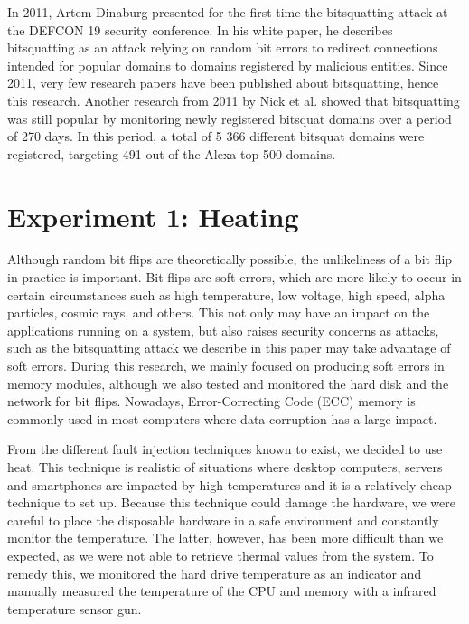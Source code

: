 \documentclass[conference]{IEEEtran}
\begin{document}
In 2011, Artem Dinaburg presented for the first time the bitsquatting attack at
the DEFCON 19 security conference. In his
white paper\cite{dinaburg2011bitsquatting}, he describes bitsquatting as an
attack relying on random bit errors to redirect connections intended for
popular domains to domains registered by malicious entities. Since 2011, very
few research papers have been published about bitsquatting, hence this
research. Another research from 2011 by Nick et
al.\cite{nikiforakis2013bitsquatting} showed that bitsquatting was still
popular by monitoring newly registered bitsquat domains over a period of
270 days. In this period, a total of 5 366 different bitsquat domains were
registered, targeting 491 out of the Alexa top 500 domains.

\section{Experiment 1: Heating}\label{sec:exp1}

Although random bit flips are theoretically possible, the unlikeliness of a bit
flip in practice is important. Bit flips are soft errors, which are more likely
to occur in certain circumstances such as high temperature, low voltage, high
speed, alpha particles, cosmic rays, and others. This not only may have an
impact on the applications running on a system, but also raises security
concerns as attacks, such as the bitsquatting attack we describe in this paper
may take advantage of soft errors. During this research, we mainly focused on
producing soft errors in memory modules, although we also tested and monitored
the hard disk and the network for bit flips. Nowadays, Error-Correcting Code
(ECC) memory is commonly used in most computers where data corruption has a
large impact.

From the different fault injection techniques known to
exist\cite{barenghi2012fault}, we decided to use heat. This technique is
realistic of situations where desktop computers, servers and smartphones are
impacted by high temperatures and it is a relatively cheap technique to set up.
Because this technique could damage the hardware, we were careful to place the
disposable hardware in a safe environment and constantly monitor the
temperature. The latter, however, has been more difficult than we expected, as
we were not able to retrieve thermal values from the system. To remedy this, we
monitored the hard drive temperature as an indicator and manually measured the
temperature of the CPU and memory with a infrared temperature sensor gun.
\end{document}
